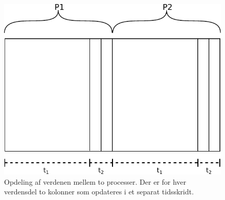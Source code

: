 \begin{figure}[hbtp] \begin{center}
  \includegraphics[scale=0.75]{images/wator}
  \caption{Opdeling af verdenen mellem to processer. Der er for hver verdensdel 
  to kolonner som opdateres i et separat tidsskridt.}
  \label{fig:wator}
  \end{center}
\end{figure}


